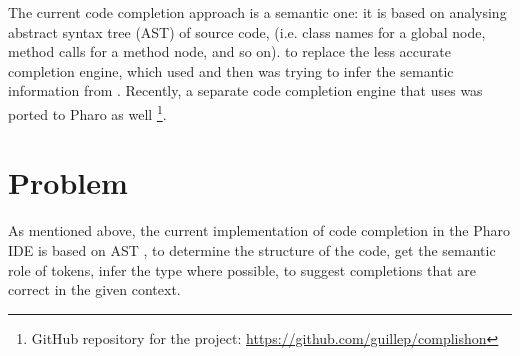 The current code completion approach is a semantic one: it is based on analysing abstract syntax tree (AST)  of source code,  (i.e. class names for a global node, method calls for a method node, and so on).  to replace the less accurate  completion engine, which used  and then was trying to infer the semantic information from . Recently, a separate code completion engine that uses  was ported to Pharo as well  \footnote{GitHub repository for the project: \url{https://github.com/guillep/complishon}}.

\section{Problem}
\label{sec:Introduction-Problem}
As mentioned above, the current  implementation of code completion in the Pharo IDE is based on  AST  ,  to determine the structure of the code, get the semantic role of tokens,  infer the type  where possible,  to  suggest  completions that are correct in the given context.

